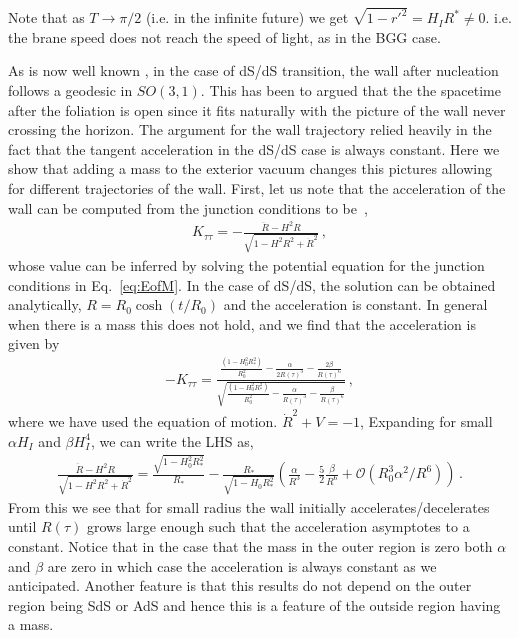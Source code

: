 \documentclass[a4paper,11pt]{article}
\numberwithin{equation}{section}
\numberwithin{equation}{section}
\begin{document}
Note that as $T\rightarrow\pi/2$ (i.e. in the infinite future) we
get $\sqrt{1-r'^{2}}=H_{I}R^{*}\ne0$. i.e. the brane speed does not
reach the speed of light, as in the BGG case. 




As is now well known \cite{Cespedes:2020xpn},  in the case of dS/dS transition,  the wall after nucleation follows a geodesic in $SO(3,1)$.  This has been to argued that the the spacetime after the foliation is open since it fits naturally with the picture of the wall never crossing the horizon.  The argument for the wall trajectory relied heavily in the fact that the tangent acceleration  in the dS/dS  case is always constant.  Here we show that adding a mass to the exterior vacuum changes this pictures allowing for different trajectories of the wall.  First,  let us note that the acceleration of the wall can be computed from the junction conditions to be~\cite{Blau:1986cw},
\begin{align}
K_{\tau\tau}=-\frac{\ddot R-H^2 R}{\sqrt{1-H^2R^2+\dot R^2}} \,,
\end{align}
whose value can be inferred by solving the potential equation for the junction conditions in Eq.~\eqref{eq:EofM}.
In the case of dS/dS,  the solution can be obtained analytically,  $R=R_0\cosh(t/R_0)$ and the acceleration is constant.  In  general when there is a mass this does not hold,  and we find that the acceleration is given by
\begin{align}
-K_{\tau\tau}=\frac{\frac{(1-H_0^2 R_*^2)}{R_0^2}-\frac{\alpha }{2R(\tau)^3}-\frac{2\beta }{R(\tau)^6}}{\sqrt{\frac{(1-H_0^2 R_*^2)}{R_0^2}-\frac{\alpha }{R(\tau)^3}-\frac{\beta }{R(\tau)^6}}} \,,
\end{align}
where we have used the equation of motion. $\dot R^2+V=-1$,  Expanding for small $\alpha H_I$ and $\beta H_I^4$,  we can write the LHS as,
\begin{align}
\frac{\ddot R-H^2 R}{\sqrt{1-H^2R^2+\dot R^2}}=\frac{\sqrt{1-H_0^2 R_*^2}}{R_*}-\frac{R_*}{\sqrt{1-H_0 R_*^2}}\left(\frac{\alpha}{R^3}-\frac{5}{2}\frac{\beta}{R^6}+\mathcal{O}(R_0^3\alpha^2/R^6)\right) \,.
\end{align}
From this we see that for small radius the wall initially  accelerates/decelerates until $R(\tau)$ grows large enough such that the acceleration asymptotes to a constant.  Notice that in the case that the mass in the outer region is zero both $\alpha$ and $\beta$ are zero in which case the acceleration is always constant as we anticipated.  Another feature is that this results do not depend on the outer region being SdS or AdS and hence this is a feature of the outside region having a mass. 
\end{document}
